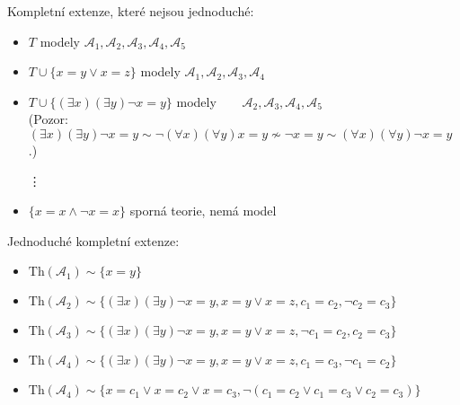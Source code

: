 \begin{problem}
\begin{solution}
\begin{enumerate}[(a)]
            Kompletní extenze, které nejsou jednoduché:
            \begin{itemize}
                \item $T$ \hfill modely $\mathcal A_1,\mathcal A_2,\mathcal A_3,\mathcal A_4,\mathcal A_5$
                \item $T\cup\{x=y\lor x=z\}$ \hfill modely $\mathcal A_1,\mathcal A_2,\mathcal A_3,\mathcal A_4\phantom{,\mathcal A_5}$
                \item $T\cup\{(\exists x)(\exists y)\neg x=y\}$ \hfill modely $\phantom{\mathcal A_1,}\mathcal A_2,\mathcal A_3,\mathcal A_4,\mathcal A_5$\\
                (Pozor: $(\exists x)(\exists y)\neg x=y\sim\neg(\forall x)(\forall y)x=y\not\sim\neg x=y\sim(\forall x)(\forall y)\neg x=y$.)
                
                \item[\vdots]
                
                \item $\{x=x\land\neg x=x\}$ \hfill sporná teorie, nemá model
            \end{itemize}

            Jednoduché kompletní extenze:
            \begin{itemize}
                \item $\mathrm{Th}(\mathcal A_1)\sim\{x=y\}$
                \item $\mathrm{Th}(\mathcal A_2)\sim\{(\exists x)(\exists y)\neg x=y,x=y\lor x=z,c_1=c_2,\neg c_2=c_3\}$
                \item $\mathrm{Th}(\mathcal A_3)\sim\{(\exists x)(\exists y)\neg x=y,x=y\lor x=z,\neg c_1=c_2,c_2=c_3\}$
                \item $\mathrm{Th}(\mathcal A_4)\sim\{(\exists x)(\exists y)\neg x=y,x=y\lor x=z,c_1=c_3,\neg c_1=c_2\}$
                \item $\mathrm{Th}(\mathcal A_4)\sim\{x=c_1 \vee x=c_2 \vee x=c_3,\neg (c_1=c_2\lor c_1=c_3\lor c_2=c_3)\}$
            \end{itemize}    
            

\end{enumerate}
\end{solution}
\end{problem}

